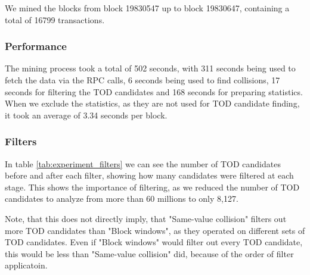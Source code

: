 \documentclass[draft,final]{vutinfth} %
\begin{document}
We mined the blocks from block 19830547 up to block 19830647, containing a total of 16799 transactions.

\subsubsection{Performance}

The mining process took a total of 502 seconds, with 311 seconds being used to fetch the data via the RPC calls, 6 seconds being used to find collisions, 17 seconds for filtering the TOD candidates and 168 seconds for preparing statistics. When we exclude the statistics, as they are not used for TOD candidate finding, it took an average of 3.34 seconds per block.

\subsubsection{Filters}

In table \ref{tab:experiment_filters} we can see the number of TOD candidates before and after each filter, showing how many candidates were filtered at each stage. This shows the importance of filtering, as we reduced the number of TOD candidates to analyze from more than 60 millions to only 8,127.

Note, that this does not directly imply, that "Same-value collision" filters out more TOD candidates than "Block windows", as they operated on different sets of TOD candidates. Even if "Block windows" would filter out every TOD candidate, this would be less than "Same-value collision" did, because of the order of filter applicatoin.
\end{document}
